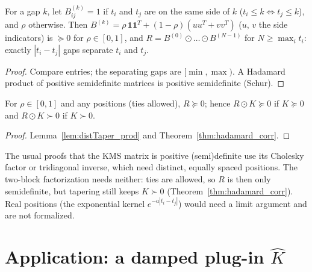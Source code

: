 \begin{lemma}\label{lem:distTaper_prod}
  \leanok
  For a gap $k$, let $B^{(k)}_{ij} = 1$ if $t_i$ and $t_j$ are on the same side
  of $k$ ($t_i \le k \iff t_j \le k$), and $\rho$ otherwise. Then
  $B^{(k)} = \rho\,\mathbf 1\mathbf 1^T + (1-\rho)(uu^T + vv^T)$ ($u$, $v$ the
  side indicators) is $\succeq 0$ for $\rho\in[0,1]$, and
  $R = B^{(0)} \odot \dots \odot B^{(N-1)}$ for $N \ge \max_i t_i$: exactly
  $|t_i - t_j|$ gaps separate $t_i$ and $t_j$.
\end{lemma}
\begin{proof}
  \leanok
  Compare entries; the separating gaps are $[\min, \max)$. A Hadamard product of
  positive semidefinite matrices is positive semidefinite (Schur).
\end{proof}

\begin{theorem}\label{thm:distTaper}
  \leanok
  For $\rho \in [0,1]$ and any positions (ties allowed), $R \succeq 0$; hence
  $R \odot K \succeq 0$ if $K \succeq 0$ and $R \odot K \succ 0$ if $K \succ 0$.
\end{theorem}
\begin{proof}
  \leanok
  Lemma~\ref{lem:distTaper_prod} and Theorem~\ref{thm:hadamard_corr}.
\end{proof}

\begin{remark}
  The usual proofs that the KMS matrix is positive (semi)definite use its
  Cholesky factor or tridiagonal inverse, which need distinct, equally spaced
  positions. The two-block factorization needs neither: ties are allowed, so
  $R$ is then only semidefinite, but tapering still keeps $K \succ 0$
  (Theorem~\ref{thm:hadamard_corr}). Real positions (the exponential kernel
  $e^{-a|t_i-t_j|}$) would need a limit argument and are not formalized.
\end{remark}

\section{Application: a damped plug-in $\hat K$}

